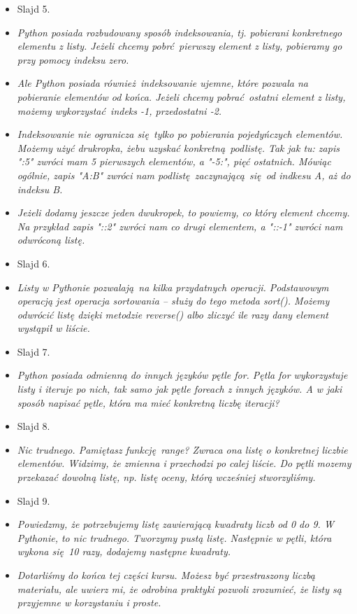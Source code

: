 \documentclass{mwart}
\begin{document}
\begin{itemize}
{      służy metoda extend. Jak się domyślasz, metod pop jest odpowiedzialna za usuwanie
      elementów z listy.}
  \item Slajd 5.
  \item \emph{Python posiada rozbudowany sposób indeksowania, tj. pobierani konkretnego
      elementu z listy. Jeżeli chcemy pobrć pierwszy element z listy, pobieramy go przy
      pomocy indeksu zero. }
  \item \emph{Ale Python posiada również indeksowanie ujemne, które pozwala na
      pobieranie elementów od końca. Jeżeli chcemy pobrać ostatni element z listy,
      możemy wykorzystać indeks -1, przedostatni -2.}
  \item \emph{Indeksowanie nie ogranicza się tylko po pobierania pojedyńczych elementów.
      Możemy użyć drukropka, żebu uzyskać konkretną podlistę. Tak jak tu: zapis ":5"
      zwróci mam 5 pierwszych elementów, a "-5:", pięć ostatnich. Mówiąc ogólnie, zapis
      "A:B" zwróci nam podlistę zaczynającą się od indkesu A, aż do indeksu B.}
  \item \emph{Jeżeli dodamy jeszcze jeden dwukropek, to powiemy, co który element
      chcemy. Na przykład zapis "::2" zwróci nam co drugi elementem, a "::-1" zwróci nam
      odwróconą listę.}
  \item Slajd 6.
  \item \emph{Listy w Pythonie pozwalają na kilka przydatnych operacji. Podstawowym operacją
      jest operacja sortowania -- służy do tego metoda sort(). Możemy odwrócić listę
      dzięki metodzie reverse() albo zliczyć ile razy dany element wystąpił w liście.}
  \item Slajd 7.
  \item \emph{Python posiada odmienną do innych języków pętle for. Pętla for
      wykorzystuje listy i iteruje po nich, tak samo jak pętle foreach z innych
      języków. A w jaki sposób napisać pętle, która ma mieć konkretną liczbę iteracji?}
  \item Slajd 8.
  \item \emph{Nic trudnego. Pamiętasz funkcję range? Zwraca ona listę o konkretnej
      liczbie elementów. Widzimy, że zmienna i przechodzi po calej liście. Do pętli
      mozemy przekazać dowolną listę, np. listę oceny, którą wcześniej stworzyliśmy.}
  \item Slajd 9.
  \item \emph{Powiedzmy, że potrzebujemy listę zawierającą kwadraty liczb od 0 do 9. W
      Pythonie, to nic trudnego. Tworzymy pustą listę. Następnie w pętli, która wykona
      się 10 razy, dodajemy następne kwadraty. }
  \item \emph{Dotarliśmy do końca tej części kursu. Możesz być przestraszony liczbą
      materiału, ale uwierz mi, że odrobina praktyki pozwoli zrozumieć, że listy są
      przyjemne w korzystaniu i proste.}
\end{itemize}
\end{document}
